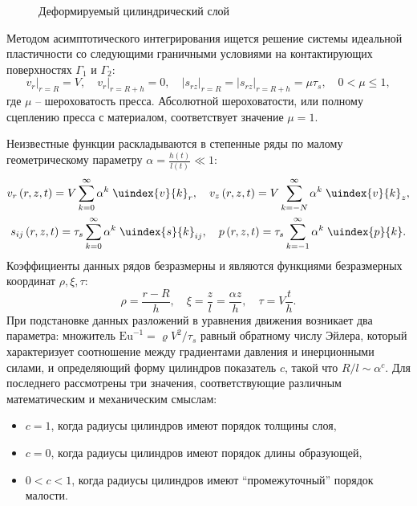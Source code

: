 \begin{figure}[ht]
  \caption{Деформируемый цилиндрический слой}
  \label{fig:ch2/layer}
\end{figure}

Методом асимптотического интегрирования ищется решение системы идеальной пластичности  со следующими граничными условиями на контактирующих поверхностях $\Gamma_{1}$ и $\Gamma_{2}$:
\begin{equation}
  v_{r}\lvert_{r=R} = V, \quad v_{r}\lvert_{r=R+h} = 0, \quad \lvert s_{rz}\lvert_{r=R} = \lvert s_{rz}\lvert_{r=R+h} = \mu \tau_{s}, \quad 0 < \mu \le 1,
\end{equation}
где $\mu$ -- шероховатость пресса. Абсолютной шероховатости, или полному сцеплению пресса с материалом, соответствует значение $\mu = 1$.

Неизвестные функции раскладываются в степенные ряды по малому геометрическому параметру $\alpha=\frac{h(t)}{l(t)}\ll1$:
\begin{gather}
  v_{r}\left(r, z, t\right) = V \sum_{k=0}^{\infty}{\alpha^{k} \; \uindex{v}{k}_{r}}, \quad v_{z}\left(r, z, t\right) = V \sum_{k=-N}^{\infty}{\alpha^{k} \; \uindex{v}{k}_{z}},
  \\
  s_{ij}\left(r, z, t\right) = \tau_{s} \sum_{k=0}^{\infty}{\alpha^{k} \; \uindex{s}{k}_{ij}}, \quad p\left(r, z, t \right) = \tau_{s} \sum_{k=-1}^{\infty}{\alpha^{k} \; \uindex{p}{k}}.
\end{gather}
Коэффициенты данных рядов безразмерны и являются функциями безразмерных координат $\rho, \xi, \tau$:
\begin{equation}
  \rho = \frac{r-R}{h}, \quad \xi = \frac{z}{l}=\frac{\alpha z}{h}, \quad \tau = V \frac{t}{h}.
\end{equation}
При подстановке данных разложений в уравнения движения возникает два параметра: множитель $\text{Eu}^{-1}=\varrho V^2/\tau_s$ равный обратному числу Эйлера, который характеризует соотношение между градиентами давления и инерционными силами, и определяющий форму цилиндров показатель $c$, такой что $R/l\sim\alpha^c$. Для последнего рассмотрены три значения, соответствующие различным математическим и механическим смыслам:
\begin{itemize}
  \item $c=1$, когда радиусы цилиндров имеют порядок толщины слоя,
  \item $c=0$, когда радиусы цилиндров имеют порядок длины образующей,
  \item $0<c<1$, когда радиусы цилиндров имеют ``промежуточный'' порядок малости.
\end{itemize}

